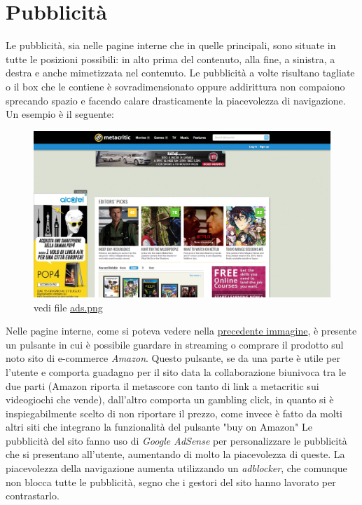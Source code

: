 \documentclass[12pt]{article}
\begin{document}
\section{Pubblicità}
Le pubblicità, sia nelle pagine interne che in quelle principali, sono situate in tutte le posizioni possibili: in alto prima del contenuto, alla fine, a sinistra, a destra e anche mimetizzata nel contenuto. Le pubblicità a volte risultano tagliate o il box che le contiene è sovradimensionato oppure addirittura non compaiono sprecando spazio e facendo calare drasticamente la piacevolezza di navigazione. Un esempio è il seguente:
\begin{figure}[H]
	\begin{center}
		\includegraphics[width=13.5cm]{ads.png}
		\caption{vedi file \href{ads.png}{ads.png}}
	\end{center}
\end{figure}
Nelle pagine interne, come si poteva vedere nella \hyperlink{interna}{precedente immagine}, è presente un pulsante in cui è possibile guardare in streaming o comprare il prodotto sul noto sito di e-commerce \textit{Amazon}. Questo pulsante, se da una parte è utile per l'utente e comporta guadagno per il sito data la collaborazione biunivoca tra le due parti (Amazon riporta il metascore con tanto di link a metacritic sui videogiochi che vende), dall'altro comporta un gambling click, in quanto si è inspiegabilmente scelto di non riportare il prezzo, come invece è fatto da molti altri siti che integrano la funzionalità del pulsante "buy on Amazon"
Le pubblicità del sito fanno uso di \textit{Google AdSense} per personalizzare le pubblicità che si presentano all'utente, aumentando di molto la piacevolezza di queste.
La piacevolezza della navigazione aumenta utilizzando un \textit{adblocker}, che comunque non blocca tutte le pubblicità, segno che i gestori del sito hanno lavorato per contrastarlo.
\newpage
\end{document}
